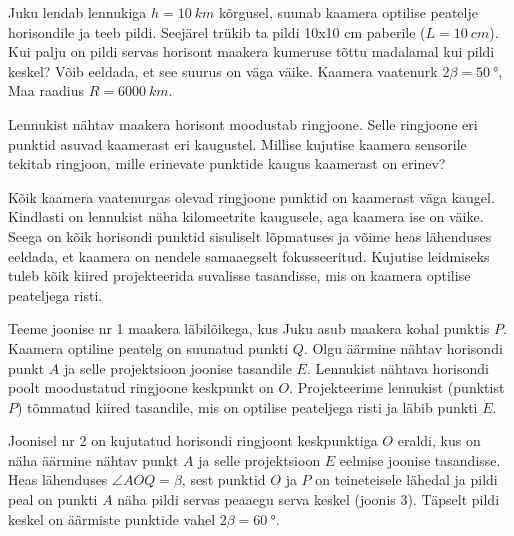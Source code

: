 
Juku lendab lennukiga $h=\SI{10}{km}$ kõrgusel, suunab kaamera optilise peatelje horisondile ja teeb pildi. Seejärel trükib ta pildi 10x10 cm paberile ($L=\SI{10}{cm}$). Kui palju on pildi servas horisont maakera kumeruse tõttu madalamal kui pildi keskel? Võib eeldada, et see suurus on väga väike. Kaamera vaatenurk $2\beta=\SI{50}{\degree}$, Maa raadius $R=\SI{6000}{km}$. 



\hint

\solu
Lennukist nähtav maakera horisont moodustab ringjoone. Selle ringjoone eri punktid asuvad kaamerast eri kaugustel. Millise kujutise kaamera sensorile tekitab ringjoon, mille erinevate punktide kaugus kaamerast on erinev?

Kõik kaamera vaatenurgas olevad ringjoone punktid on kaamerast väga kaugel. Kindlasti on lennukist näha kilomeetrite kaugusele, aga kaamera ise on väike. Seega on kõik horisondi punktid sisuliselt lõpmatuses ja võime heas lähenduses eeldada, et kaamera on nendele samaaegselt fokusseeritud. Kujutise leidmiseks tuleb kõik kiired projekteerida suvalisse tasandisse, mis on kaamera optilise peateljega risti.

Teeme joonise nr 1 maakera läbilõikega, kus Juku asub maakera kohal punktis $P$. Kaamera optiline peatelg on suunatud punkti $Q$. Olgu äärmine nähtav horisondi punkt $A$ ja selle projektsioon joonise tasandile $E$. Lennukist nähtava horisondi poolt moodustatud ringjoone keskpunkt on $O$. Projekteerime lennukist (punktist $P$) tõmmatud kiired tasandile, mis on optilise peateljega risti ja läbib punkti $E$.

Joonisel nr 2 on kujutatud horisondi ringjoont keskpunktiga $O$ eraldi, kus on näha äärmine nähtav punkt $A$ ja selle projektsioon $E$ eelmise joonise tasandisse. Heas lähenduses $\angle AOQ = \beta$, sest punktid $O$ ja $P$ on teineteisele lähedal ja pildi peal on punkti $A$ näha pildi servas peaaegu serva keskel (joonis 3). Täpselt pildi keskel on äärmiste punktide vahel $2\beta = \SI{60}{\degree}$.

